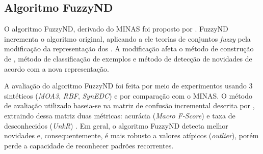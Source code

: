 \subsection{Algoritmo FuzzyND}


O algoritmo FuzzyND, derivado do MINAS foi proposto por .
FuzzyND incrementa o algoritmo original, aplicando a ele teorias de
conjuntos \emph{fuzzy} pela modificação da representação dos \clusters.
A modificação afeta o método de construção de \clusters, método de classificação
de exemplos e método de detecção de novidades de acordo com a nova representação.


A avaliação do algoritmo FuzzyND foi feita por meio de experimentos usando 3 
\datasets sintéticos (\emph{MOA3}, \emph{RBF}, \emph{SynEDC})
e por comparação com o MINAS.
O método de avaliação utilizado baseia-se na matriz de confusão incremental
descrita por , extraindo dessa matriz duas métricas:
acurácia (\emph{Macro F-Score}) \cite{Sokolova2009} e
taxa de desconhecidos (\emph{UnkR}) \cite{Faria2016minas}.
Em geral, o algoritmo FuzzyND detecta melhor novidades e, consequentemente,
é mais robusto a valores atípicos (\emph{outlier}), porém perde a capacidade
de reconhecer padrões recorrentes.


